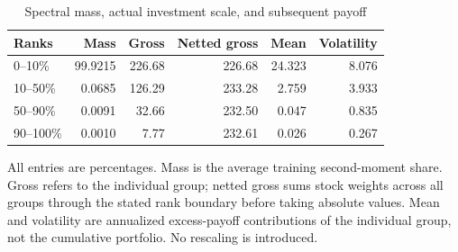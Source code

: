 \begin{table}[p]\centering\small{}
\caption{Spectral mass, actual investment scale, and subsequent payoff}\label{tab:financial}
\begin{tabular}{lrrrrr}
\toprule
Ranks & Mass & Gross & Netted gross & Mean & Volatility \\
\midrule
0--10\% & 99.9215 & 226.68 & 226.68 & 24.323 & 8.076 \\
10--50\% & 0.0685 & 126.29 & 233.28 & 2.759 & 3.933 \\
50--90\% & 0.0091 & 32.66 & 232.50 & 0.047 & 0.835 \\
90--100\% & 0.0010 & 7.77 & 232.61 & 0.026 & 0.267 \\
\bottomrule\end{tabular}\par\vspace{5pt}
\begin{minipage}{\textwidth}\footnotesize All entries are percentages. Mass is the average training second-moment share. Gross refers to the individual group; netted gross sums stock weights across all groups through the stated rank boundary before taking absolute values. Mean and volatility are annualized excess-payoff contributions of the individual group, not the cumulative portfolio. No rescaling is introduced.\end{minipage}\end{table}

